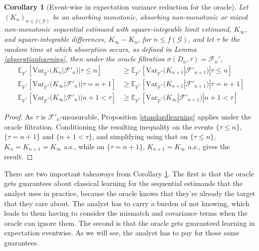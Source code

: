 \documentclass{article}
\newcommand{\Var}{\mathrm{Var}_{\mathbb{P}^*} }
\newtheorem{cor}{Corollary}
\begin{document}
\begin{cor}[Event-wise in expectation variance reduction for the oracle]
\label{oraclelearning}
Let $(K_n)_{n\leq f(\mathcal{G})}$ be an absorbing monotonic, absorbing non-monotonic or mixed non-monotonic sequential estimand with square-integrable limit estimand, $K_\infty$, and square-integrable differences, $K_\infty-K_n$, for $n\leq f(\mathcal{G})$, and let $\tau$ be the random time at which absorption occurs, as defined in Lemma \ref{absorptionlearning}, then under the oracle filtration $\sigma(D_n, \tau)=\mathcal{F}_n'$, 
\begin{align*}
\mathbb{E}_{\mathbb{P}^*}[\Var(K_n|\mathcal{F}'_n)|\tau \leq n]&\geq \mathbb{E}_{\mathbb{P}^*}[\Var(K_{n+1}|\mathcal{F}'_{n+1})|\tau \leq n]\\
\mathbb{E}_{\mathbb{P}^*}[\Var(K_\infty|\mathcal{F}'_n)|\tau = n+1]&\geq \mathbb{E}_{\mathbb{P}^*}[\Var(K_{n+1}|\mathcal{F}'_{n+1})|\tau = n+1]\\
\mathbb{E}_{\mathbb{P}^*}[\Var(K_\infty|\mathcal{F}'_n)|n+1<\tau]&\geq \mathbb{E}_{\mathbb{P}^*}[\Var(K_\infty|\mathcal{F}'_{n+1})|n+1<\tau]
\end{align*}
\end{cor}
\begin{proof}
    As $\tau$ is $\mathcal{F}'_n$-measurable, Proposition \ref{standardlearning} applies under the oracle filtration. Conditioning the resulting inequality on the events $\{\tau \leq n\}$, $\{\tau = n+1\}$ and $\{n+1<\tau\}$, and simplifying using that on $\{\tau \leq n\}$, $K_n=K_{n+1}=K_\infty$ a.s., while on $\{\tau = n+1\}$, $K_{n+1}=K_\infty$ a.s., gives the result.
\end{proof}

There are two important takeaways from Corollary \ref{oraclelearning}. The first is that the oracle gets guarantees about classical learning for the sequential estimands that the analyst uses in practice, because the oracle knows that they're already the target that they care about. The analyst has to carry a burden of not knowing, which leads to them having to consider the mismatch and covariance terms when the oracle can ignore them. The second is that the oracle gets guaranteed learning in expectation eventwise. As we will see, the analyst has to pay for those same guarantees.
\end{document}
